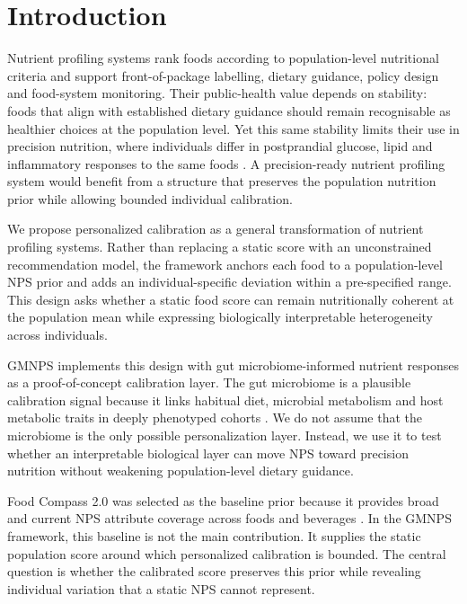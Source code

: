 \section*{Introduction}

Nutrient profiling systems rank foods according to population-level nutritional
criteria and support front-of-package labelling, dietary guidance, policy design
and food-system monitoring. Their public-health value depends on stability:
foods that align with established dietary guidance should remain recognisable as
healthier choices at the population level. Yet this same stability limits their
use in precision nutrition, where individuals differ in postprandial glucose,
lipid and inflammatory responses to the same foods
\cite{zeevi2015personalized,berry2020postprandial}. A precision-ready nutrient
profiling system would benefit from a structure that preserves the population
nutrition prior while allowing bounded individual calibration.

We propose personalized calibration as a general transformation of nutrient
profiling systems. Rather than replacing a static score with an unconstrained
recommendation model, the framework anchors each food to a population-level NPS
prior and adds an individual-specific deviation within a pre-specified range.
This design asks whether a static food score can remain nutritionally coherent
at the population mean while expressing biologically interpretable heterogeneity
across individuals.

GMNPS implements this design with gut microbiome-informed nutrient responses as
a proof-of-concept calibration layer. The gut microbiome is a plausible
calibration signal because it links habitual diet, microbial metabolism and host
metabolic traits in deeply phenotyped cohorts
\cite{asnicar2021microbiome,asnicar2025gut}. We do not assume that the
microbiome is the only possible personalization layer. Instead, we use it to
test whether an interpretable biological layer can move NPS toward precision
nutrition without weakening population-level dietary guidance.

Food Compass 2.0 was selected as the baseline prior because it provides broad
and current NPS attribute coverage across foods and beverages
\cite{mozaffarian2021foodcompass,barrett2024foodcompass2}. In the GMNPS
framework, this baseline is not the main contribution. It supplies the static
population score around which personalized calibration is bounded. The central
question is whether the calibrated score preserves this prior while revealing
individual variation that a static NPS cannot represent.

